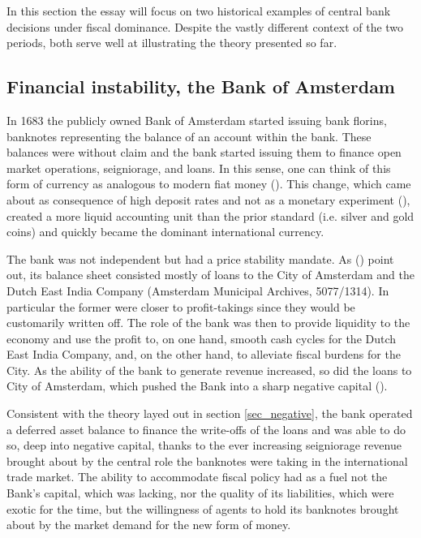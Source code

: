\documentclass[american]{scrartcl}
\newcommand{\citein}[1]{\citeauthor{#1} (\citeyear{#1})}
\begin{document}
In this section the essay will focus on two historical examples of central bank decisions under fiscal dominance. Despite the vastly different context of the two periods, both serve well at illustrating the theory presented so far.

\subsection{Financial instability, the Bank of Amsterdam}

In 1683 the publicly owned Bank of Amsterdam started issuing bank florins, banknotes representing the balance of an account within the bank. These balances were without claim and the bank started issuing them to finance open market operations, seigniorage, and loans. In this sense, one can think of this form of currency as analogous to modern fiat money (\cite[p. 3]{Quinn2014}). This change, which came about as consequence of high deposit rates and not as a monetary experiment (\cite[p. 3]{Quinn2014}), created a more liquid accounting unit than the prior standard (i.e. silver and gold coins) and quickly became the dominant international currency.

The bank was not independent but had a price stability mandate. As \citein{Quinn2014} point out, its balance sheet consisted mostly of loans to the City of Amsterdam and the Dutch East India Company (Amsterdam Municipal Archives, 5077/1314). In particular the former were closer to profit-takings since they would be customarily written off. The role of the bank was then to provide liquidity to the economy and use the profit to, on one hand, smooth cash cycles for the Dutch East India Company, and, on the other hand, to alleviate fiscal burdens for the City. As the ability of the bank to generate revenue increased, so did the loans to City of Amsterdam, which pushed the Bank into a sharp negative capital (\cite[p. 5]{Quinn2014}).

Consistent with the theory layed out in section \ref{sec_negative}, the bank operated a deferred asset balance to finance the write-offs of the loans and was able to do so, deep into negative capital, thanks to the ever increasing seigniorage revenue brought about by the central role the banknotes were taking in the international trade market. The ability to accommodate fiscal policy had as a fuel not the Bank's capital, which was lacking, nor the quality of its liabilities, which were exotic for the time, but the willingness of agents to hold its banknotes brought about by the market demand for the new form of money.
\end{document}
